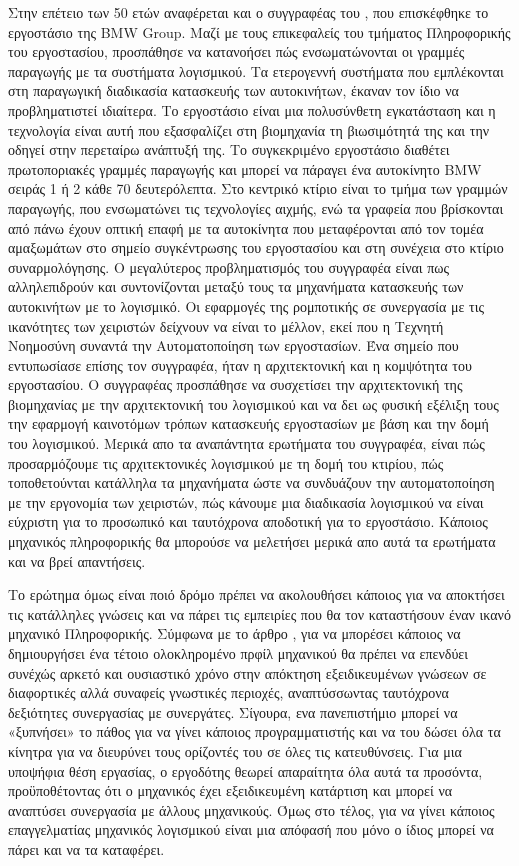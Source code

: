 \documentclass[11pt]{article}
\begin{document}
	Στην επέτειο των 50 ετών αναφέρεται και ο συγγραφέας του \cite{kersten2017end}, που επισκέφθηκε το εργοστάσιο της \foreignlanguage{english}{BMW Group}. Μαζί με τους επικεφαλείς του τμήματος Πληροφορικής του εργοστασίου, προσπάθησε να κατανοήσει πώς ενσωματώνονται οι γραμμές παραγωγής με τα συστήματα λογισμικού. Τα ετερογεννή συστήματα που εμπλέκονται στη παραγωγική διαδικασία κατασκευής των αυτοκινήτων, έκαναν τον ίδιο να προβληματιστεί ιδιαίτερα. Το εργοστάσιο είναι μια πολυσύνθετη εγκατάσταση και η τεχνολογία είναι αυτή που εξασφαλίζει στη βιομηχανία τη βιωσιμότητά της και την οδηγεί στην περεταίρω ανάπτυξή της. Το συγκεκριμένο εργοστάσιο διαθέτει πρωτοποριακές γραμμές παραγωγής και μπορεί να πάραγει ένα αυτοκίνητο \foreignlanguage{english}{BMW} σειράς 1 ή 2 κάθε 70 δευτερόλεπτα. Στο κεντρικό κτίριο είναι το τμήμα των γραμμών παραγωγής, που ενσωματώνει τις τεχνολογίες αιχμής, ενώ τα γραφεία που βρίσκονται από πάνω έχουν οπτική επαφή με τα αυτοκίνητα που μεταφέρονται από τον τομέα αμαξωμάτων στο σημείο συγκέντρωσης του εργοστασίου και στη συνέχεια στο κτίριο συναρμολόγησης. Ο μεγαλύτερος προβληματισμός του συγγραφέα είναι πως αλληλεπιδρούν και συντονίζονται μεταξύ τους τα μηχανήματα  κατασκευής των αυτοκινήτων με το λογισμικό. Οι εφαρμογές της ρομποτικής σε συνεργασία με τις ικανότητες των χειριστών δείχνουν να είναι το μέλλον, εκεί που η Τεχνητή Νοημοσύνη συναντά την Αυτοματοποίηση των εργοστασίων. Ένα σημείο που εντυπωσίασε επίσης τον συγγραφέα, ήταν η αρχιτεκτονική και η κομψότητα του εργοστασίου. Ο συγγραφέας προσπάθησε να συσχετίσει την αρχιτεκτονική της βιομηχανίας με την αρχιτεκτονική του λογισμικού και να δει ως φυσική εξέλιξη τους την εφαρμογή καινοτόμων τρόπων κατασκευής εργοστασίων με βάση και την δομή του λογισμικού. Μερικά απο τα αναπάντητα ερωτήματα του συγγραφέα, είναι πώς προσαρμόζουμε τις αρχιτεκτονικές λογισμικού με τη δομή του κτιρίου, πώς τοποθετούνται κατάλληλα τα μηχανήματα ώστε να συνδυάζουν την αυτοματοποίηση με την εργονομία των χειριστών, πώς κάνουμε μια διαδικασία λογισμικού να είναι εύχριστη για το προσωπικό και ταυτόχρονα αποδοτική για το εργοστάσιο. Κάποιος μηχανικός πληροφορικής θα μπορούσε να μελετήσει μερικά απο αυτά τα ερωτήματα και να βρεί απαντήσεις.  
	\par
	Το ερώτημα όμως είναι ποιό δρόμο πρέπει να ακολουθήσει κάποιος για να αποκτήσει τις κατάλληλες γνώσεις και να πάρει τις εμπειρίες που θα τον καταστήσουν έναν ικανό μηχανικό Πληροφορικής. Σύμφωνα με το άρθρο \cite{8405631}, για να μπορέσει κάποιος να δημιουργήσει ένα τέτοιο ολοκληρομένο πρφίλ μηχανικού θα πρέπει να επενδύει συνέχώς αρκετό και ουσιαστικό χρόνο στην απόκτηση εξειδικευμένων γνώσεων σε διαφορτικές αλλά συναφείς γνωστικές περιοχές, αναπτύσσωντας ταυτόχρονα δεξιότητες συνεργασίας με συνεργάτες. Σίγουρα, ενα πανεπιστήμιο μπορεί να «ξυπνήσει» το πάθος για να γίνει κάποιος προγραμματιστής και να του δώσει όλα τα κίνητρα για να διευρύνει τους ορίζοντές του σε όλες τις κατευθύνσεις. Για μια υποψήφια θέση εργασίας, ο εργοδότης θεωρεί απαραίτητα όλα αυτά τα προσόντα, προϋποθέτοντας ότι ο μηχανικός έχει εξειδικευμένη κατάρτιση και μπορεί να αναπτύσει συνεργασία με άλλους μηχανικούς. Όμως στο τέλος, για να γίνει κάποιος επαγγελματίας μηχανικός λογισμικού είναι μια απόφασή που μόνο ο ίδιος μπορεί να πάρει και να τα καταφέρει. 
\end{document}
